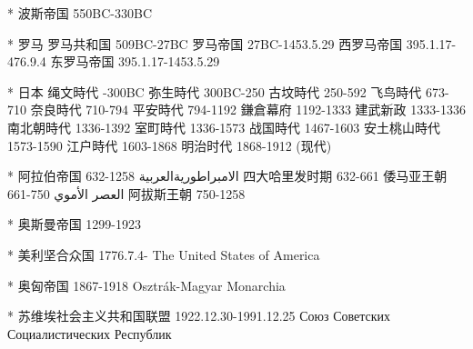 		* 波斯帝国	550BC-330BC

		* 罗马
			罗马共和国	509BC-27BC
			罗马帝国 27BC-1453.5.29
			西罗马帝国	395.1.17-476.9.4
			东罗马帝国	395.1.17-1453.5.29

		* 日本
			绳文時代	-300BC
			弥生時代	300BC-250
			古坟時代	250-592
			飞鸟時代	673-710
			奈良時代    710-794
			平安時代	794-1192
			鎌倉幕府	1192-1333
			建武新政	1333-1336
			南北朝時代	1336-1392
			室町時代	1336-1573
			战国時代	1467-1603	
			安土桃山時代	1573-1590
			江户時代	1603-1868
			明治时代	1868-1912	
			(现代)

		* 阿拉伯帝国	632-1258	الامبراطوريةالعربية
			四大哈里发时期	632-661
			倭马亚王朝	661-750	العصر الأموي
			阿拔斯王朝	750-1258

		* 奥斯曼帝国	1299-1923

		* 美利坚合众国	1776.7.4-	The United States of America

		* 奥匈帝国	1867-1918 Osztrák-Magyar Monarchia

		* 苏维埃社会主义共和国联盟	1922.12.30-1991.12.25	Союз Советских Социалистических Республик
	
		

